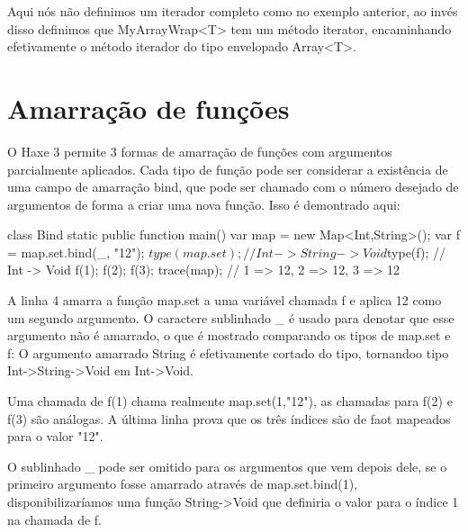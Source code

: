 {Aqui nós não definimos um iterador completo como no exemplo anterior, ao invés disso definimos que MyArrayWrap<T> tem um método iterator, encaminhando efetivamente o método iterador do tipo envelopado Array<T>.

\section{Amarração de funções}

O Haxe 3 permite 3 formas de amarração de funções com argumentos parcialmente aplicados. Cada tipo de função pode ser considerar a existência de uma campo de amarração bind, que pode ser chamado com o número desejado de argumentos de forma a criar uma nova função. Isso é demontrado aqui:

class Bind {
    static public function main() {
        var map = new Map<Int,String>();
        var f = map.set.bind(_, "12");
        $type(map.set); // Int -> String -> Void
        $type(f); // Int -> Void
        f(1);
        f(2);
        f(3);
        trace(map); // {1 => 12, 2 => 12, 3 => 12}
   }
}

A linha 4 amarra a função map.set a uma variável chamada f e aplica 12 como um segundo argumento. O caractere sublinhado _ é usado para denotar que esse argumento não é amarrado, o que é mostrado comparando os tipos de map.set e f: O argumento amarrado String é efetivamente cortado do tipo, tornandoo tipo Int->String->Void em Int->Void.

Uma chamada de f(1) chama realmente map.set(1,"12"), as chamadas para f(2) e f(3) são análogas. A última linha prova que os três índices são de faot mapeados para o valor "12".

O sublinhado _ pode ser omitido para os argumentos que vem depois dele, se o primeiro argumento fosse amarrado através de map.set.bind(1), disponibilizaríamos uma função String->Void que definiria o  valor para o índice 1 na chamada de f.


}
